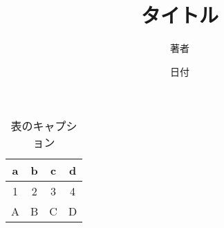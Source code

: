 \documentclass[a4j]{jsarticle}
\title{タイトル}
\author{著者}
\date{日付}
\begin{document}
\begin{table}[htbp]
 \centering
 \caption{表のキャプション}
 \begin{tabular}{|c|c|c|c|}
  \hline
  a & b & c & d \\ \hline
  1 & 2 & 3 & 4 \\ \hline
  A & B & C & D \\ \hline
 \end{tabular}
\end{table}
\end{document}
